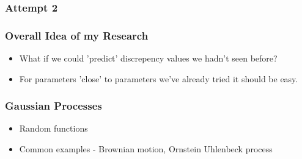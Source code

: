 \documentclass{beamer}
\begin{document}
\begin{frame}
    \frametitle{Attempt 2}
    \begin{figure}
        \centering
    \end{figure}


\end{frame}

\begin{frame}
    \frametitle{Overall Idea of my Research}
    \begin{itemize}
        \item What if we could 'predict' discrepency values we hadn't seen before?
        \item <2-> For parameters 'close' to parameters we've already tried it should be easy.
    \end{itemize}
\end{frame}

\begin{frame}
    \frametitle{Gaussian Processes}
    \begin{itemize}
        \item Random functions
        \item Common examples - Brownian motion, Ornstein Uhlenbeck process
    \end{itemize}
\end{frame}
\end{document}
